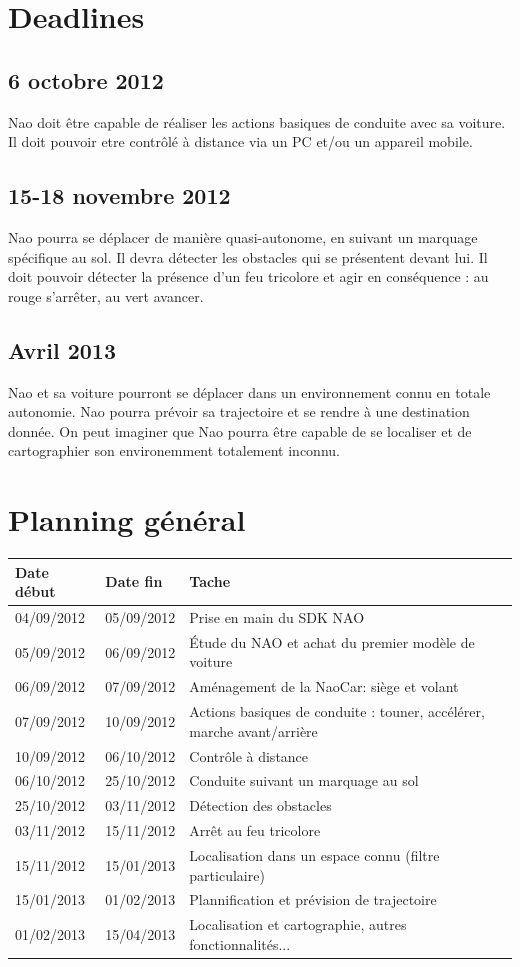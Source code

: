 \documentclass[11pt]{report} %
\begin{document}
	\section{Deadlines}
		\subsection{6 octobre 2012}
			Nao doit être capable de réaliser les actions basiques de conduite avec sa voiture.\\
			Il doit pouvoir etre contrôlé à distance via un PC et/ou un appareil mobile.
		\subsection{15-18 novembre 2012}
			Nao pourra se déplacer de manière quasi-autonome, en suivant un marquage spécifique au sol.
			Il devra détecter les obstacles qui se présentent devant lui.
			Il doit pouvoir détecter la présence d'un feu tricolore et agir en conséquence : au rouge s'arrêter, au vert avancer.
		\subsection{Avril 2013}
			Nao et sa voiture pourront se déplacer dans un environnement connu en totale autonomie.
			Nao pourra prévoir sa trajectoire et se rendre à une destination donnée.
			On peut imaginer que Nao pourra être capable de se localiser et de cartographier son environemment totalement inconnu.
	\section{Planning général}
		\begin{tabular}{|l|l|l|}
			\hline
			Date début & Date fin & Tache\\ \hline
			04/09/2012 & 05/09/2012 & Prise en main du SDK NAO\\ \hline
			05/09/2012 & 06/09/2012 & Étude du NAO et achat du premier modèle de voiture\\ \hline
			06/09/2012 & 07/09/2012 & Aménagement de la NaoCar: siège et volant\\ \hline
			07/09/2012 & 10/09/2012 & Actions basiques de conduite : touner, accélérer, marche avant/arrière\\ \hline
			10/09/2012 & 06/10/2012 & Contrôle à distance\\ \hline
			06/10/2012 & 25/10/2012 & Conduite suivant un marquage au sol\\ \hline
			25/10/2012 & 03/11/2012 & Détection des obstacles\\ \hline
			03/11/2012 & 15/11/2012 & Arrêt au feu tricolore\\ \hline
			15/11/2012 & 15/01/2013 & Localisation dans un espace connu (filtre particulaire)\\ \hline
			15/01/2013 & 01/02/2013 & Plannification et prévision de trajectoire\\ \hline
			01/02/2013 & 15/04/2013 & Localisation et cartographie, autres fonctionnalités...\\ \hline
			\end{tabular}
\end{document}
